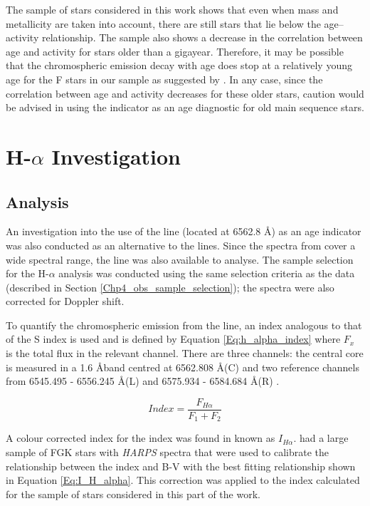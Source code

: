The sample of stars considered in this work shows that even when mass and metallicity are taken into account, there are still stars that lie below the age--activity relationship. The sample also shows a decrease in the correlation between age and activity for stars older than a gigayear. Therefore, it may be possible that the chromospheric emission decay with age does stop at a relatively young age for the F stars in our sample as suggested by \citet{Pace_2013}. In any case, since the correlation between age and activity decreases for these older stars, caution would be advised in using the \Rprime indicator as an age diagnostic for old main sequence stars.

\section{\texorpdfstring{H-$\alpha$}{H-alpha} Investigation}
\label{Chp4_halpha}
\subsection{Analysis}
An investigation into the use of the \Halpha line (located at 6562.8 \AA) as an age indicator was also conducted as an alternative to the \caII lines. Since the spectra from \citet{Bruntt_etal_2012} cover a wide spectral range, the \Halpha line was also available to analyse. The sample selection for the H-$\alpha$ analysis was conducted using the same selection criteria as the \caII data (described in Section \ref{Chp4_obs_sample_selection}); the spectra were also corrected for Doppler shift.

To quantify the chromospheric emission from the \Halpha line, an index analogous to that of the S index is used and is defined by Equation \ref{Eq:h_alpha_index} where $F_{x}$ is the total flux in the relevant channel. There are three channels: the central \Halpha core is measured in a 1.6 \AA \space band centred at 6562.808 \AA \space (C) and two reference channels from 6545.495 - 6556.245 \AA \space (L) and 6575.934 - 6584.684 \AA \space (R) \citep{Gomes_da_Silva_etal_2011}.

\begin{equation}
    Index = \frac{F_{H{\alpha}}}{F_{1}+F_{2}}
    \label{Eq:h_alpha_index}
\end{equation}

A colour corrected index for the \Halpha index was found in \citet{Gomes_da_Silva_etal_2014} known as $I_{H\alpha}$. \citet{Gomes_da_Silva_etal_2014} had a large sample of FGK stars with \textit{HARPS} spectra that were used to calibrate the relationship between the \Halpha index and B-V with the best fitting relationship shown in Equation \ref{Eq:I_H_alpha}. This correction was applied to the \Halpha index calculated for the sample of stars considered in this part of the work.

